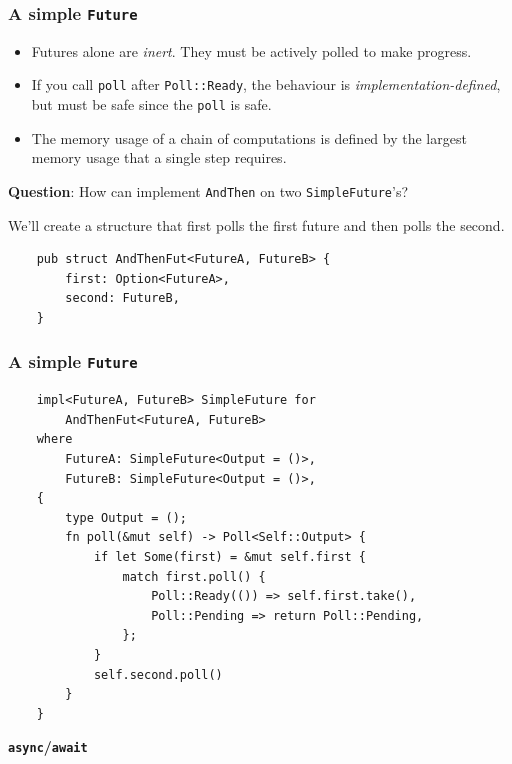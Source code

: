 \documentclass[aspectratio=1610,t]{beamer}
\begin{document}
\begin{frame}[fragile]
\frametitle{A simple \texttt{Future}}
\begin{itemize}
    \item Futures alone are \textit{inert}. They must be actively polled to make progress.
    \item If you call \texttt{poll} after \texttt{Poll::Ready}, the behaviour is \textit{implementation-defined}, but must be safe since the \texttt{poll} is safe.
    \item The memory usage of a chain of computations is defined by the largest memory usage that a single step requires.
\end{itemize}

\textbf{Question}: How can implement \texttt{AndThen} on two \texttt{SimpleFuture}'s?

We'll create a structure that first polls the first future and then polls the second.

\begin{verbatim}
    pub struct AndThenFut<FutureA, FutureB> {
        first: Option<FutureA>,
        second: FutureB,
    }
\end{verbatim}
\end{frame}


\begin{frame}[fragile]
\frametitle{A simple \texttt{Future}}
\begin{verbatim}
    impl<FutureA, FutureB> SimpleFuture for
        AndThenFut<FutureA, FutureB>
    where
        FutureA: SimpleFuture<Output = ()>,
        FutureB: SimpleFuture<Output = ()>,
    {
        type Output = ();
        fn poll(&mut self) -> Poll<Self::Output> {
            if let Some(first) = &mut self.first {
                match first.poll() {
                    Poll::Ready(()) => self.first.take(),
                    Poll::Pending => return Poll::Pending,
                };
            }
            self.second.poll()
        }
    }
\end{verbatim}
\end{frame}


\begin{frame}[c]
\centering\Huge\textbf{\texttt{async}/\texttt{await}}
\end{frame}
\end{document}
